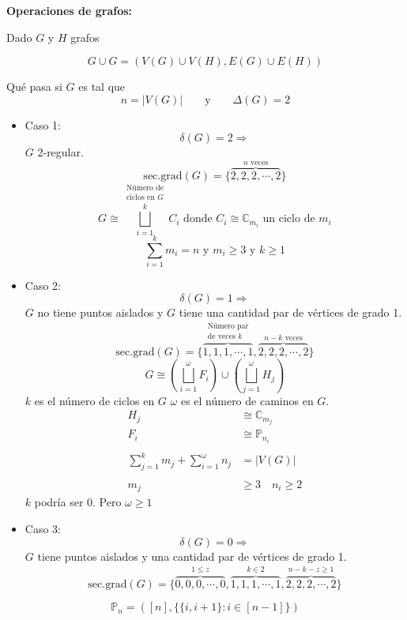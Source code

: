 \documentclass[../main.tex]{subfiles}
\begin{document}
\textbf{Operaciones de grafos:}

Dado $G$ y $H$ grafos

\[
	G\cup G=
	(
	V(G)\cup V(H),
	E(G)\cup E(H)
	)
\]

\begin{figure}[H]
	\centering
	
\end{figure}

\begin{figure}[H]
	\centering
	
\end{figure}

Qué pasa si $G$ es tal que
\[
	n = |V(G)|\qquad\text{y}\qquad\Delta(G)=2
\]

\begin{itemize}
	\item Caso 1:
		\[
			\delta(G)=2 \Rightarrow
		\]
		$G$ 2-regular.
		\[
			\text{sec.grad}(G)=
			\{
				\overbrace
				{
					2,2,2,\cdots,2
				}^
				{
					\text{$n$ veces}
				}
			\}
		\]
		\[
			G\cong
			\overset
			{
				\substack
				{
					\text{Número de}\\
					\text{ciclos en $G$}
				}
			}
			{
				\bigsqcup_{i=1}^k
			}
			C_i \text{ donde }
			C_i \cong \mathbb{C}_{m_i} \text{ un ciclo de $m_i$}
		\]
		\[
			\sum_{i=1}^k m_i = n \text{ y } m_i \geq 3 \text { y } k \geq 1
		\]
	\item Caso 2:
		\[
			\delta(G)=1 \Rightarrow
		\]
		$G$ no tiene puntos aislados y $G$ tiene una cantidad par de vértices
		de grado 1.
		\[
			\text{sec.grad}(G)=
			\{
				\overbrace
				{
					1,1,1,\cdots,1
				}^
				{
					\substack
					{
						\text{Número par}\\
						\text{de veces $k$}
					}
				}
				,
				\overbrace
				{
					2,2,2,\cdots,2
				}^
				{
					\text{$n-k$ veces}
				}
			\}
		\]
		\[
			G \cong
			\left(
				\bigsqcup_{i=1}^\omega F_i
			\right)
			\cup
			\left(
				\bigsqcup_{j=1}^\omega H_j
			\right)
		\]
		$k$ es el número de ciclos en $G$ $\omega$ es el número de
		caminos en $G$.
		\begin{align*}
			H_j &\cong \mathbb{C}_{m_j}\\
			F_i &\cong \mathbb{P}_{n_i}\\
			\\
			\sum_{j=1}^k m_j +
			\sum_{i=1}^\omega n_j
			&= |V(G)|\\
			\\
			m_j &\geq 3 \quad n_i \geq 2
		\end{align*}
		$k$ podría ser 0. Pero $\omega \geq 1$
	\item Caso 3:
		\[
			\delta(G)=0 \Rightarrow
		\]
		$G$ tiene puntos aislados y una cantidad par de vértices de grado 1.
		\[
			\text{sec.grad}(G)=
			\{
				\overbrace
				{
					0,0,0,\cdots,0
				}^
				{
					1\leq z
				}
				,
				\overbrace
				{
					1,1,1,\cdots,1
				}^
				{
					k\in \dot{2}
				}
				,
				\overbrace
				{
					2,2,2,\cdots,2
				}^
				{
					n-k-z\geq 1
				}
			\}
		\]
\end{itemize}
\[
	\mathbb{P}_n =
	(
		[n],
		\{
			\{i,i+1\}:
			i\in[n-1]
		\}
	)
\]
\end{document}
